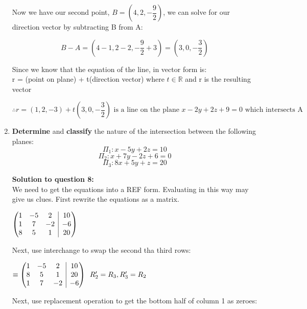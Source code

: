 \documentclass[12pt]{book}
\makeatletter
\newenvironment{amatrix}[1]{%
  \left(\begin{array}{@{}*{#1}{c}|c@{}}
}{%
  \end{array}\right)
}
\makeatother
\begin{document}
\begin{enumerate}
\vspace{-1cm}
Now we have our second point, $B = \left( 4, 2, -\dfrac{9}{2} \right)$, we can solve for our direction vector by subtracting B from A:

$$B-A = \left( 4-1, 2-2, -\dfrac{9}{2}+3 \right) = \left( 3, 0, -\dfrac{3}{2} \right)$$

Since we know that the equation of the line, in vector form is: \\
r = (point on plane) + t(direction vector) where $t \in \mathbb{R}$  and r is the resulting vector

\vspace{0.5cm}
\begin{center}
  $\boxed{\therefore r = (1, 2, -3) + t(3, 0, -\dfrac{3}{2}) \text{ is a line on the plane } x-2y+2z+9=0 \text{ which intersects A}}$
\end{center}

\vspace{0.3cm}

\newpage

\item \textbf{Determine} and \textbf{classify} the nature of the intersection between the following planes:
$$\Pi_1: x-5y+2z=10 $$
$$\Pi_2: x+7y-2z+6=0 $$
$$\Pi_3: 8x+5y+z=20 $$

\vspace{0.3cm} 
\textbf{Solution to question 8:}\\
 We need to get the equations into a REF form. 
 Evaluating in this way may give us clues. First rewrite the equations 
 as a matrix.
\vspace{0.4cm}

$
\begin{amatrix}{3}
   1 & -5 & 2 & 10\\  1 & 7 & -2  & -6\\ 8 & 5 & 1 & 20 
 \end{amatrix}
$

\vspace{0.4cm}
Next, use interchange to swap the second tha third rows:
\vspace{0.4cm}

$
\equiv
\begin{amatrix}{3}
   1 & -5 & 2 & 10\\  8 & 5 & 1 & 20\\ 1 & 7 & -2  & -6
 \end{amatrix}
 \text{\space \space } R'_2 = R_3, R'_3 = R_2
$

\vspace{0.4cm}
Next, use replacement operation to get the bottom half of column 1 as zeroes:
\vspace{0.4cm}


\end{enumerate}
\end{document}
